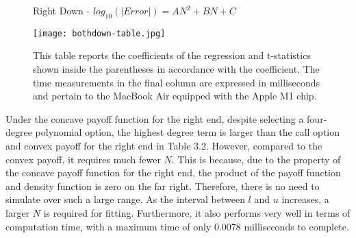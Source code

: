 \begin{figure}[ht]
    \begin{table}[H]
      \centering
      \caption[$log_{10}(|Error|)=AN^2+BN+C$]{Right Down - $log_{10}(|Error|)=AN^2+BN+C$}
    \end{table}
    \centering
        \texttt{[image: bothdown-table.jpg]}
    \caption*{\small{This table reports the coefficients of the regression and t-statistics shown inside the parentheses in accordance with the coefficient. The time measurements in the final column are expressed in milliseconds and pertain to the MacBook Air equipped with the Apple M1 chip.}}
\end{figure}

Under the concave payoff function for the right end, despite selecting a four-degree polynomial option, the highest degree term is larger than the call option and convex payoff for the right end in Table 3.2. However, compared to the convex payoff, it requires much fewer $N$. This is because, due to the property of the concave payoff function for the right end, the product of the payoff function and density function is zero on the far right. Therefore, there is no need to simulate over such a large range. As the interval between $l$ and $u$ increases, a larger $N$ is required for fitting. Furthermore, it also performs very well in terms of computation time, with a maximum time of only 0.0078 milliseconds to complete.


